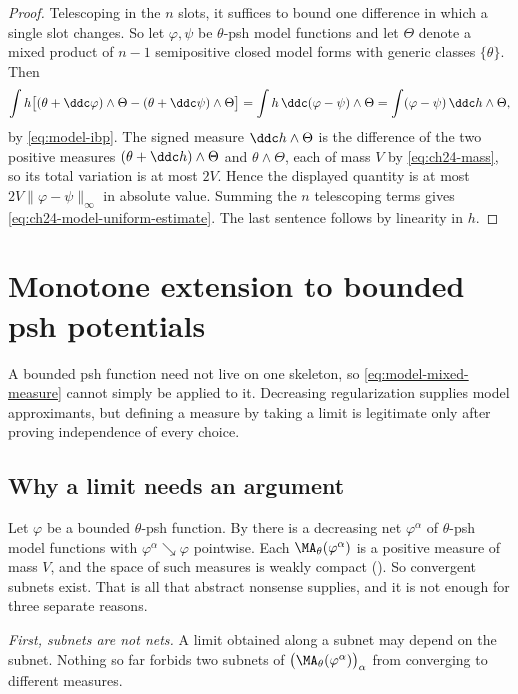 \begin{proof}
Telescoping in the $n$ slots, it suffices to bound one difference in which
a single slot changes.  So let $\varphi,\psi$ be $\theta$-psh model
functions and let $\Theta$ denote a mixed product of $n-1$ semipositive
closed model forms with generic classes $\{\theta\}$.  Then
\[
 \int h\bigl[(\theta+\ddc\varphi)\wedge\Theta
   -(\theta+\ddc\psi)\wedge\Theta\bigr]
 =\int h\,\ddc(\varphi-\psi)\wedge\Theta
 =\int(\varphi-\psi)\,\ddc h\wedge\Theta,
\]
by \eqref{eq:model-ibp}.  The signed measure $\ddc h\wedge\Theta$ is the
difference of the two positive measures $(\theta+\ddc h)\wedge\Theta$ and
$\theta\wedge\Theta$, each of mass $V$ by
\eqref{eq:ch24-mass}, so its total variation is at most $2V$.  Hence the
displayed quantity is at most $2V\|\varphi-\psi\|_\infty$ in absolute
value.  Summing the $n$ telescoping terms gives
\eqref{eq:ch24-model-uniform-estimate}.  The last sentence follows by
linearity in $h$.
\end{proof}

\section{Monotone extension to bounded psh potentials}
\label{sec:ch24-bounded}

A bounded psh function need not live on one skeleton, so
\eqref{eq:model-mixed-measure} cannot simply be applied to it. Decreasing
regularization supplies model approximants, but defining a measure by taking
a limit is legitimate only after proving independence of every choice.

\subsection{Why a limit needs an argument}
\label{sec:ch24-why-argument}

Let $\varphi$ be a bounded $\theta$-psh function.  By
 there is a decreasing net
$\varphi^\alpha$ of $\theta$-psh model functions with
$\varphi^\alpha\searrow\varphi$ pointwise.  Each
$\MA_\theta(\varphi^\alpha)$ is a positive measure of mass $V$, and the
space of such measures is weakly compact
().  So convergent subnets exist.  That is
all that abstract nonsense supplies, and it is not enough for three separate
reasons.

\emph{First, subnets are not nets.}  A limit obtained along a subnet may
depend on the subnet.  Nothing so far forbids two subnets of
$\bigl(\MA_\theta(\varphi^\alpha)\bigr)_\alpha$ from converging to
different measures.

